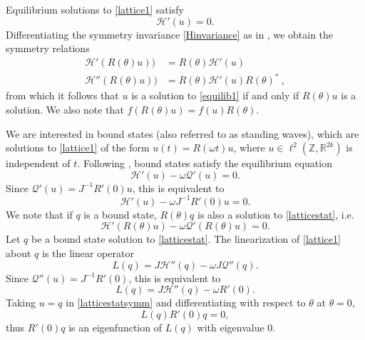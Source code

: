 \documentclass[12pt]{elsarticle}
\def\R{{\mathbb R}}
\def\Z{{\mathbb Z}}
\begin{document}
Equilibrium solutions to \cref{lattice1} satisfy 
\begin{equation}\label{equilib1}
\mathcal{H}'(u) = 0.
\end{equation}
Differentiating the symmetry invariance \cref{Hinvariance} as in \cite{Grillakis1987}, we obtain the symmetry relations
\begin{equation}\label{symmetryrel}
\begin{aligned}
\mathcal{H}'(R(\theta)u)) &= R(\theta) \mathcal{H}'(u) \\
\mathcal{H}''(R(\theta)u)) &= R(\theta) \mathcal{H}'(u) R(\theta)^* \:,
\end{aligned}
\end{equation}
from which it follows that $u$ is a solution to \cref{equilib1} if and only if $R(\theta)u$ is a solution. We also note that $f(R(\theta)u) = f(u)R(\theta)$.

We are interested in bound states (also referred to as standing waves), which are solutions to \cref{lattice1} of the form $u(t) = R(\omega t)u$, where $u \in \ell^2(\Z, \R^{2k})$ is independent of $t$. Following \cite{Grillakis1987}, bound states satisfy the equilibrium equation
\begin{equation}\label{latticestat}
\mathcal{H}'(u) - \omega \mathcal{Q}'(u) = 0.
\end{equation}
Since $\mathcal{Q}'(u) = J^{-1}R'(0) u$, this is equivalent to
\begin{equation}\label{latticestat2}
\mathcal{H}'(u) - \omega J^{-1}R'(0) u = 0.
\end{equation}
We note that if $q$ is a bound state, $R(\theta)q$ is also a solution to \eqref{latticestat}, i.e.
\begin{equation}\label{latticestatsymm}
\mathcal{H}'(R(\theta)u) - \omega \mathcal{Q}'(R(\theta)u) = 0.
\end{equation}
Let $q$ be a bound state solution to \cref{latticestat}. The linearization of \cref{lattice1} about $q$ is the linear operator
\begin{equation}\label{latticeL}
L(q) = J \mathcal{H}''(q) - \omega J \mathcal{Q}''(q).
\end{equation}
Since $\mathcal{Q}''(u) = J^{-1}R'(0)$, this is equivalent to
\begin{equation}\label{latticeL2}
L(q) = J \mathcal{H}''(q) - \omega R'(0).
\end{equation}
Taking $u = q$ in \eqref{latticestatsymm} and differentiating with respect to $\theta$ at $\theta = 0$,
\begin{equation}\label{Lkernel1}
L(q) R'(0) q = 0,
\end{equation}
thus $R'(0) q$ is an eigenfunction of $L(q)$ with eigenvalue 0.
\end{document}
